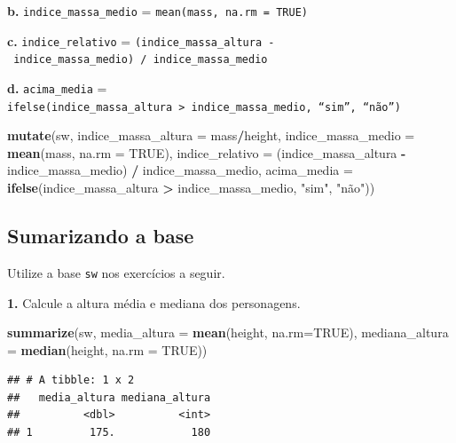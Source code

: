 \documentclass[
]{book}
\newenvironment{Shaded}{\begin{snugshade}}{\end{snugshade}}
\newcommand{\AttributeTok}[1]{\textcolor[rgb]{0.13,0.29,0.53}{#1}}
\newcommand{\ConstantTok}[1]{\textcolor[rgb]{0.56,0.35,0.01}{#1}}
\newcommand{\FunctionTok}[1]{\textcolor[rgb]{0.13,0.29,0.53}{\textbf{#1}}}
\newcommand{\NormalTok}[1]{#1}
\newcommand{\SpecialCharTok}[1]{\textcolor[rgb]{0.81,0.36,0.00}{\textbf{#1}}}
\newcommand{\StringTok}[1]{\textcolor[rgb]{0.31,0.60,0.02}{#1}}
\begin{document}
\textbf{b.} \texttt{indice\_massa\_medio} = \texttt{mean(mass,\ na.rm\ =\ TRUE)}

\textbf{c.} \texttt{indice\_relativo} =
\texttt{(indice\_massa\_altura\ -\ indice\_massa\_medio)\ /\ indice\_massa\_medio}

\textbf{d.} \texttt{acima\_media} =
\texttt{ifelse(indice\_massa\_altura\ \textgreater{}\ indice\_massa\_medio,\ “sim”,\ “não”)}

\begin{Shaded}
\begin{Highlighting}[]
\FunctionTok{mutate}\NormalTok{(sw, }
       \AttributeTok{indice\_massa\_altura =}\NormalTok{ mass}\SpecialCharTok{/}\NormalTok{height,}
       \AttributeTok{indice\_massa\_medio =} \FunctionTok{mean}\NormalTok{(mass, }\AttributeTok{na.rm =} \ConstantTok{TRUE}\NormalTok{),}
       \AttributeTok{indice\_relativo =}\NormalTok{ (indice\_massa\_altura }\SpecialCharTok{{-}}\NormalTok{ indice\_massa\_medio) }\SpecialCharTok{/}\NormalTok{ indice\_massa\_medio,}
       \AttributeTok{acima\_media =} \FunctionTok{ifelse}\NormalTok{(indice\_massa\_altura }\SpecialCharTok{\textgreater{}}\NormalTok{ indice\_massa\_medio, }\StringTok{"sim"}\NormalTok{, }\StringTok{"não"}\NormalTok{))}
\end{Highlighting}
\end{Shaded}

\subsection{Sumarizando a base}\label{sumarizando-a-base}

Utilize a base \texttt{sw} nos exercícios a seguir.

\textbf{1.} Calcule a altura média e mediana dos personagens.

\begin{Shaded}
\begin{Highlighting}[]
\FunctionTok{summarize}\NormalTok{(sw, }
          \AttributeTok{media\_altura =} \FunctionTok{mean}\NormalTok{(height, }\AttributeTok{na.rm=}\ConstantTok{TRUE}\NormalTok{),}
          \AttributeTok{mediana\_altura =} \FunctionTok{median}\NormalTok{(height, }\AttributeTok{na.rm =} \ConstantTok{TRUE}\NormalTok{))}
\end{Highlighting}
\end{Shaded}

\begin{verbatim}
## # A tibble: 1 x 2
##   media_altura mediana_altura
##          <dbl>          <int>
## 1         175.            180
\end{verbatim}
\end{document}
